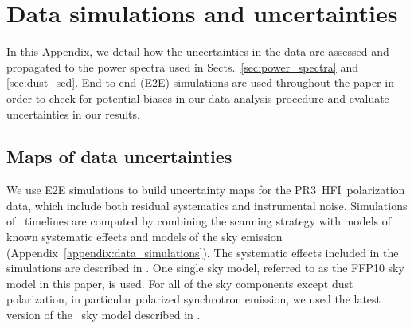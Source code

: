 \documentclass[longauth,traditabstract]{aa}
\newcommand{\HFI}{HFI}
\newcommand{\PR}{PR3}
\begin{document}





\appendix
\section{Data simulations and uncertainties}
\label{appendix:methodology}

In this Appendix, we detail how the uncertainties in the data are assessed and propagated to the power spectra used in Sects.~\ref{sec:power_spectra} 
and \ref{sec:dust_sed}.
End-to-end (E2E) simulations are used throughout the paper
in order to check for potential biases in our data analysis procedure and evaluate uncertainties in our results. 

\subsection{Maps of data uncertainties}
\label{subsec:validation}

We use E2E simulations to build uncertainty maps for the \PR\ \HFI\ polarization data, which include both residual systematics and instrumental noise. 
Simulations of \Planck\ timelines are computed by combining the scanning strategy with models of known systematic effects and models of the sky emission (Appendix~\ref{appendix:data_simulations}).
The systematic effects included in the simulations are described in \citet{planck2016-l03}. One single sky model, referred to as the FFP10 sky model in this paper,  is used.
For all of the sky components except dust polarization, in particular polarized synchrotron emission, we used the latest version of the \Planck\ sky model described in
\citet{planck2014-a14}.  
\end{document}
